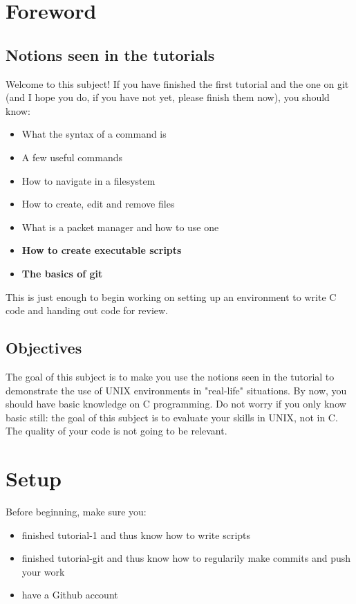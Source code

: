 \documentclass[12pt]{article}
\let\oldhref\href
\renewcommand{\href}[2]{\oldhref{#1}{\bfseries#2}}
\begin{document}
\section{Foreword}
\subsection{Notions seen in the tutorials}

Welcome to this subject! If you have finished the first tutorial and the one on git (and I hope you do, if you have not yet, please finish them now), you should know:

\begin{itemize}
\item What the syntax of a command is
\item A few useful commands
\item How to navigate in a filesystem
\item How to create, edit and remove files
\item What is a packet manager and how to use one 
\item \textbf{How to create executable scripts}
\item \textbf{The basics of git}

\end{itemize}

This is just enough to begin working on setting up an environment to write C code and handing out code for review.

\subsection{Objectives}

The goal of this subject is to make you use the notions seen in the tutorial to demonstrate the use of UNIX environments in "real-life" situations. By now, you should have basic knowledge on C programming. Do not worry if you only know basic still: the goal of this subject is to evaluate your skills in UNIX, not in C. The quality of your code is not going to be relevant.

\section{Setup}

Before beginning, make sure you:

\begin{itemize}
	\item finished tutorial-1 and thus know how to write scripts
	\item finished tutorial-git and thus know how to regularily make commits and push your work
	\item have a Github account%
\end{itemize}
\end{document}

